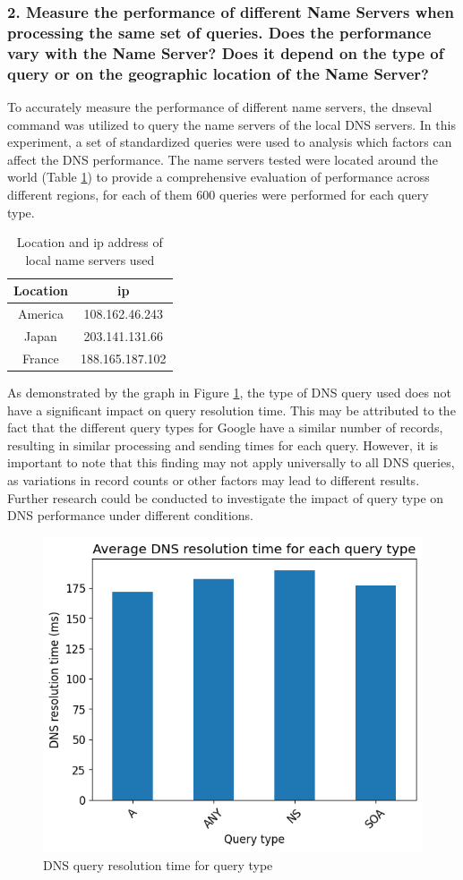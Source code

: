 \documentclass[eng]{class}
\begin{document}
\subsubsection*{2. Measure the performance of different Name Servers when processing the same
  set of queries. Does the performance vary with the Name Server? Does it depend
  on the type of query or on the geographic location of the Name Server?}
To accurately measure the performance of different name servers, the dnseval command was utilized to query the name servers of the local DNS servers.
In this experiment, a set of standardized queries were used to analysis which factors can affect the DNS performance.
The name servers tested were located around the world (Table \ref*{tab-6}) to provide a comprehensive evaluation of performance across different regions,
for each of them 600 queries were performed for each query type.
\begin{table}[H]
  \centering
  \begin{tabular}{cc}
    \linewidth=0cm
    Location & ip              \\
    \hline
    America  & 108.162.46.243  \\
    Japan    & 203.141.131.66  \\
    France   & 188.165.187.102 \\
  \end{tabular}
  \caption{Location and ip address of local name servers used}
  \label{tab-6}
\end{table}

As demonstrated by the graph in Figure \ref{fig-6}, the type of DNS query used does not have a significant impact on query resolution time.
This may be attributed to the fact that the different query types for Google have a similar number of records,
resulting in similar processing and sending times for each query.
However, it is important to note that this finding may not apply universally to all DNS queries, as variations in record counts or other factors may lead to different results.
Further research could be conducted to investigate the impact of query type on DNS performance under different conditions.

\begin{figure}[H]
  \centering
  \includegraphics[width=.7\columnwidth]{images/latQueryType.png}
  \caption{DNS query resolution time for query type}
  \label{fig-6}
\end{figure}
\end{document}
